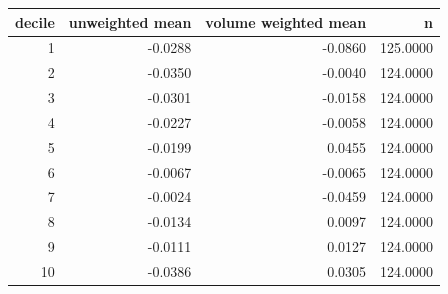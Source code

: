 \begin{tabular}{rrrr}
\toprule
decile & unweighted mean & volume weighted mean & n \\
\midrule
1 & -0.0288 & -0.0860 & 125.0000 \\
2 & -0.0350 & -0.0040 & 124.0000 \\
3 & -0.0301 & -0.0158 & 124.0000 \\
4 & -0.0227 & -0.0058 & 124.0000 \\
5 & -0.0199 & 0.0455 & 124.0000 \\
6 & -0.0067 & -0.0065 & 124.0000 \\
7 & -0.0024 & -0.0459 & 124.0000 \\
8 & -0.0134 & 0.0097 & 124.0000 \\
9 & -0.0111 & 0.0127 & 124.0000 \\
10 & -0.0386 & 0.0305 & 124.0000 \\
\bottomrule
\end{tabular}
